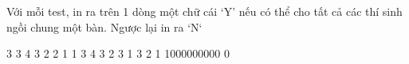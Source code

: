 Với mỗi test, in ra trên 1 dòng một chữ cái ‘Y’ nếu có thể cho tất cả các thí sinh ngồi chung một bàn. Ngược lại in ra ‘N‘

3 3 4 3 2 2 1 1 3 4 3 2 3 1 3 2 1 1000000000 0